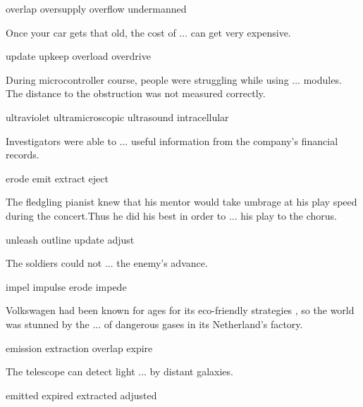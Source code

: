 \documentclass{exam}
\begin{document}
\begin{questions}
\begin{oneparchoices}
\correctchoice overlap
\choice oversupply
\choice overflow
\choice undermanned
\end{oneparchoices}
\question Once your car gets that old, the cost of ... can get very expensive.\\
\begin{oneparchoices}
\choice update 
\correctchoice upkeep
 \choice overload
 \choice overdrive 
\end{oneparchoices}
\question During microcontroller course, people were struggling while using ... modules.  The distance to the obstruction was not measured correctly.\\
\begin{oneparchoices}
\choice ultraviolet
\choice ultramicroscopic
\correctchoice ultrasound
\choice intracellular
\end{oneparchoices}
\question Investigators were able to ... useful information from the company's financial records.\\
\begin{oneparchoices}
 \choice erode
 \choice emit
 \correctchoice extract
 \choice eject
\end{oneparchoices}
\question The fledgling pianist knew that his mentor would take umbrage at his play speed during the concert.Thus he did his best in order to ... his play to the chorus.\\
\begin{oneparchoices}
\choice unleash
\choice outline
\choice update
\correctchoice adjust
\end{oneparchoices}

\question The soldiers could not ... the enemy's advance.\\
\begin{oneparchoices}
 \choice impel
 \choice impulse
 \choice erode 
 \correctchoice impede
\end{oneparchoices}

\question  Volkswagen had been known for ages for its eco-friendly strategies , so the world was stunned by the ... of dangerous gases in its Netherland's factory.\\
\begin{oneparchoices}
\correctchoice emission
\choice extraction
\choice overlap
\choice expire
\end{oneparchoices}
\question The telescope can detect light ... by distant galaxies.\\
\begin{oneparchoices}
 \correctchoice emitted
 \choice expired 
 \choice extracted
 \choice adjusted
\end{oneparchoices}


\end{questions}
\end{document}
